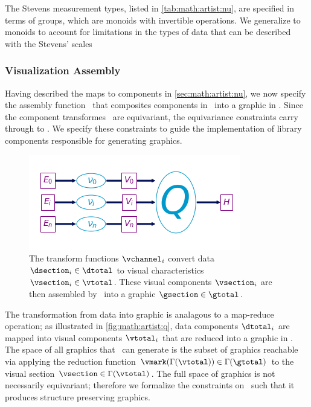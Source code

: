 \documentclass[../main.tex]{subfiles}
\begin{document}
The Stevens measurement types\cite{stevensTheoryScalesMeasurement1946}, listed in \autoref{tab:math:artist:nu}, are specified in terms of groups, which are monoids with invertible operations\cite{remlingAlgebraMath5353}. We generalize to monoids to account for limitations in the types of data that can be described with the Stevens' scales \cite{johnsonPseudoMathematicsMentalSocial1936,thomasMathematizationNotMeasurement2014} 

\subsubsection{Visualization Assembly}
Having described the maps to components in \autoref{sec:math:artist:nu}, we now specify the assembly function \vmarkd\ that composites components in \vtotal\ into a graphic in \gtotal. Since the component transformes \vchannel\ are equivariant, the equivariance constraints carry through to \vmarkd. We specify these constraints to guide the implementation of library components responsible for generating graphics. 

\label{sec:math:artist:q}
\begin{figure}[htb]
  \centering
  \includegraphics[width=\textwidth]{figures/math/path_of_q.png}
  \caption{The transform functions $\vchannel_i$ convert data $\dsection_i\in \dtotal$ to visual characteristics $\vsection_i \in \vtotal$. These visual components $\vsection_i$ are then assembled by \vmark\ into a graphic $\gsection \in \gtotal$.} 
  \label{fig:math:artist:q}
\end{figure}
The transformation from data into graphic is analagous to a map-reduce operation; as illustrated in \autoref{fig:math:artist:q}, data components $\dtotal_{i}$ are mapped into visual components $\vtotal_{i}$ that are reduced into a graphic in \gtotal. The space of all graphics that \vmark\ can generate is the subset of graphics reachable via applying the reduction function $\vmark(\Gamma(\vtotal)) \in \Gamma(\gtotal)$ to the visual section $\vsection \in \Gamma(\vtotal)$. The full space of graphics is not necessarily equivariant; therefore we formalize the constraints on \vmark\ such that it produces structure preserving graphics. 
\end{document}
